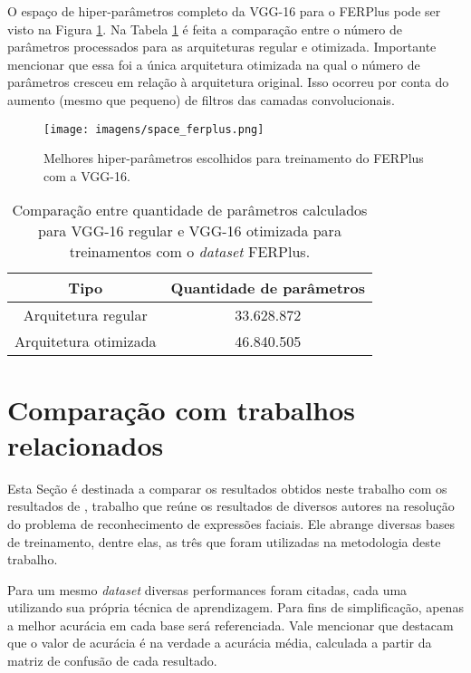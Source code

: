 \documentclass[
12pt,       %
openright,      %
oneside,      %
a4paper,      %
english,      %
french,       %
spanish,      %
brazil        %
]{abntex2}
\begin{document}
O espaço de hiper-parâmetros completo da VGG-16 para o FERPlus pode ser visto na Figura \ref{fig:space_ferplus}. Na Tabela \ref{tab:comparacao-parametros-vgg16-ferplus} é feita a comparação entre o número de parâmetros processados para as arquiteturas regular e otimizada. Importante mencionar que essa foi a única arquitetura otimizada na qual o número de parâmetros cresceu em relação à arquitetura original. Isso ocorreu por conta do aumento (mesmo que pequeno) de filtros das camadas convolucionais. 

\begin{figure}[H]
\centering
\caption{Melhores hiper-parâmetros escolhidos para treinamento do FERPlus com a VGG-16.}
\texttt{[image: imagens/space\_ferplus.png]}
\label{fig:space_ferplus}
\end{figure}

\begin{table}[H]
\centering
\caption{Comparação entre quantidade de parâmetros calculados para VGG-16 regular e VGG-16 otimizada para treinamentos com o \textit{dataset} FERPlus.}
\label{tab:comparacao-parametros-vgg16-ferplus}
\begin{tabular}{@{}cc@{}}
\toprule
\textbf{Tipo}         & \textbf{Quantidade de parâmetros} \\ \midrule
Arquitetura regular   & 33.628.872                         \\
Arquitetura otimizada & 46.840.505                        \\ \bottomrule
\end{tabular}
\end{table}

\section{Comparação com trabalhos relacionados} \label{comparacao-trabalhos-relacionados}

Esta Seção é destinada a comparar os resultados obtidos neste trabalho com os resultados de , trabalho que reúne os resultados de diversos autores na resolução do problema de reconhecimento de expressões faciais. Ele abrange diversas bases de treinamento, dentre elas, as três que foram utilizadas na metodologia deste trabalho.

Para um mesmo \textit{dataset} diversas performances foram citadas, cada uma utilizando sua própria técnica de aprendizagem. Para fins de simplificação, apenas a melhor acurácia em cada base será referenciada. Vale mencionar que  destacam que o valor de acurácia é na verdade a acurácia média, calculada a partir da matriz de confusão de cada resultado.
\end{document}
